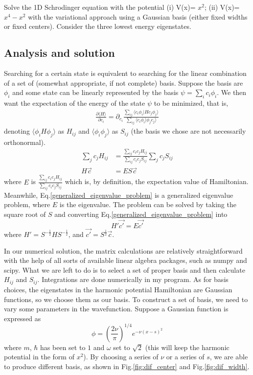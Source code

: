 \documentclass{article}
\begin{document}
Solve the 1D Schrodinger equation with the potential (i) V(x)= $x^2$; (ii) V(x)= $x^4-x^2$ with the variational approach using a Gaussian basis (either fixed widths or fixed centers). Consider the three lowest energy eigenstates. 

\subsection{Analysis and solution}

Searching for a certain state is equivalent to searching for the linear combination of a set of (somewhat appropriate, if not complete) basis. Suppose the basis are $\phi_i$ and some state can be linearly represented by the basis $\psi = \sum_i c_i \phi_i$. We then want the expectation of the energy of the state $\psi$ to be minimized, that is, 
\begin{align}
    \frac{\partial \langle H\rangle}{\partial c_i} = \partial_{c_i}\frac{\sum_{ij}\langle c_i\phi_i|H c_j\phi_j\rangle}{\sum_{ij}\langle c_i\phi_i|\phi_j c_j\rangle}
\end{align}
denoting $\langle \phi_i H\phi_j \rangle$ as $H_{ij}$ and $\langle \phi_i \phi_j \rangle$ as $S_{ij}$ (the basis we chose are not necessarily orthonormal). 
\begin{align}
    \sum_jc_jH_{ij}&=\frac{\sum_{ij}c_ic_jH_{ij}}{\sum_{ij}c_ic_jS_{ij}}\sum_jc_jS_{ij}\\
    H\vec{c} &= E S\vec{c}\label{generalized_eigenvalue_problem}
\end{align}
where $E$ is $\frac{\sum_{ij}c_ic_jH_{ij}}{\sum_{ij}c_ic_jS_{ij}}$ which is, by definition, the expectation value of Hamiltonian. Meanwhile, Eq.\ref{generalized_eigenvalue_problem} is a generalized eigenvalue problem, where $E$ is the eigenvalue. The problem can be solved by taking the square root of $S$ and converting Eq.\ref{generalized_eigenvalue_problem} into
\begin{equation}
    H'\vec{c'} = E\vec{c'}
\end{equation}
where $H'=S^{-\frac{1}{2}}HS^{-\frac{1}{2}}$, and $\vec{c'}=S^{\frac{1}{2}}\vec{c}$.\par

In our numerical solution, the matrix calculations are relatively straightforward with the help of all sorts of available linear algebra packages, such as numpy and scipy. What we are left to do is to select a set of proper basis and then calculate $H_{ij}$ and $S_{ij}$. Integrations are done numerically in my program. As for basis choices, the eigenstates in the harmonic potential Hamiltonian are Gaussian functions, so we choose them as our basis. To construct a set of basis, we need to vary some parameters in the wavefunction. Suppose a Gaussian function is expressed as
\begin{equation}
    \phi = (\frac{2\nu}{\pi})^{1/4} e^{-\nu(x-s)^2}
\end{equation}
where $m$, $\hbar$ has been set to $1$ and $\omega$ set to $\sqrt{2}$ (this will keep the harmonic potential in the form of $x^2$). By choosing a series of $\nu$ or a series of $s$, we are able to produce different basis, as shown in Fig.\ref{fig:dif_center} and Fig.\ref{fig:dif_width}.
\end{document}
